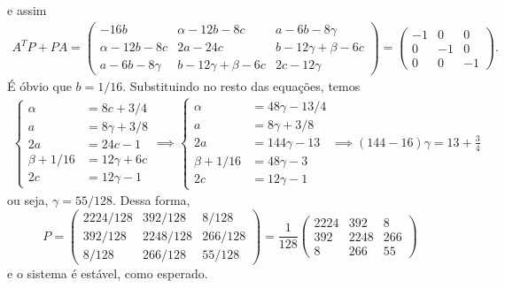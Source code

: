	e assim
	\begin{align*}
		A^T P + PA = 
		\begin{pmatrix}
			   -16b       &    \alpha-12b-8c    &   a-6b-8\gamma      \\
			\alpha-12b-8c &       2a-24c        & b-12\gamma+\beta-6c \\
			a-6b-8\gamma  & b-12\gamma+\beta-6c &    2c-12\gamma
		\end{pmatrix}
		=	
		\begin{pmatrix}
		    -1&  0 & 0 \\
			0 & -1 & 0 \\
			0 &  0 & -1
		\end{pmatrix}.
	\end{align*}
	É óbvio que $b=1/16$. Substituindo no resto das equações, temos
	\begin{align*}
		\left\{
			\begin{array}{ll}
				\alpha       &= 8c + 3/4 \\
				a            &= 8\gamma + 3/8 \\
				2a           &= 24c - 1 \\
				\beta + 1/16 &= 12\gamma + 6c \\
				2c           &= 12\gamma-1 
			\end{array}
		\right.
		\implies
		\left\{
			\begin{array}{ll}
				\alpha &= 48\gamma - 13/4 \\
				a &= 8\gamma + 3/8 \\
				2a &= 144\gamma - 13 \\
				\beta + 1/16 &= 48\gamma - 3 \\
				2c &= 12\gamma-1 
			\end{array}
		\right.
		\implies
		(144-16)\gamma = 13 + \frac{3}{4}
	\end{align*}
	ou seja, $\gamma = 55/128$.
	Dessa forma, 
	\[
		P = 
		\begin{pmatrix}
			2224/128 &  392/128 & 8/128 \\
			392/128  & 2248/128 & 266/128 \\
			8/128    &  266/128 & 55/128
		\end{pmatrix}
	    =
	    \frac{1}{128}
	    \begin{pmatrix}
	    	2224 &  392 & 8 \\
	    	392  & 2248 & 266 \\
	    	8    &  266 & 55
	    \end{pmatrix}	    
	\]
	e o sistema é estável, como esperado. \\

